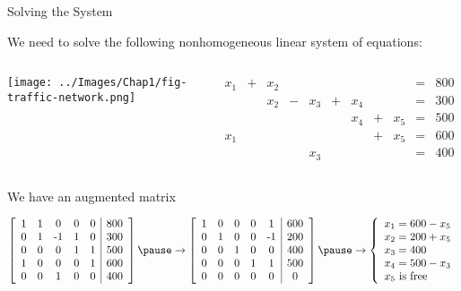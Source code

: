 \documentclass[xcolor=dvipsnames, aspectratio=169]{beamer}
\begin{document}
\begin{frame}{Solving the System}

  We need to solve the following nonhomogeneous linear system of equations:

  \begin{columns}[T]
    \column{0.3\tw}

    \texttt{[image: ../Images/Chap1/fig-traffic-network.png]}
    
      \column{0.7\tw}
\[   \begin{array}{ccccccccccc}
    x_1 & + & x_2 &   &         &    &        &   &          &= & 800\\
           &     & x_2 & - & x_3 & + & x_4 &   &         &=& 300\\
           &     &        &    &        &    & x_4 & + & x_5 &=& 500\\
    x_1 &     &        &    &       &     &        & + & x_5 &=& 600\\
           &      &        &   & x_3 &    &        &     &        &=& 400
\end{array} \]

\pause
\end{columns}

   We have an augmented matrix

    \[
        \aMat{ccccc|c}{
   $1$ & $1$ & $0$ & $0$ & $0$ & $800$\\
   $0$ & $1$ & $-1$ & $1$ & $0$ & $300$\\
   $0$ & $0$ & $0$ & $1$ & $1$ & $500$\\
   $1$ & $0$ & $0$ & $0$ & $1$ & $600$\\
   $0$ & $0$ & $1$ & $0$ & $0$ & $400$
        }\pause\rightarrow\aMat{ccccc|c}{
   $1$ & $0$ & $0$ & $0$ & $1$ & $600$\\
   $0$ & $1$ & $0$ & $0$ & $-1$ & $200$\\
   $0$ & $0$ & $1$ & $0$ & $0$ & $400$\\
   $0$ & $0$ & $0$ & $1$ & $1$ & $500$\\
   $0$ & $0$ & $0$ & $0$ & $0$ & $0$
        }
   \pause\rightarrow
   \left\{ \begin{array}{l}
     x_1=600-x_5\\
     x_2 = 200 + x_5\\
     x_3 = 400\\
     x_4 = 500-x_3\\
     x_5 \mbox{ is free}
     \end{array} \right.
    \]

\end{frame}

  
\end{document}
